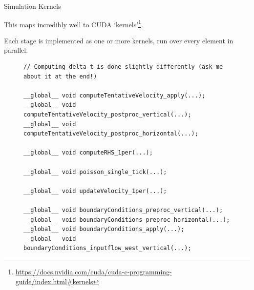 \begin{frame}[fragile]{Simulation Kernels}
        \begin{wideitemize}
            \item This maps incredibly well to CUDA `kernels'\footnote{\url{https://docs.nvidia.com/cuda/cuda-c-programming-guide/index.html\#kernels}}.
            \item Each stage is implemented as one or more kernels, run over every element in parallel.
        \end{wideitemize}
    \begin{figure}[b]
        \centering

        \begin{lstlisting}
// Computing delta-t is done slightly differently (ask me about it at the end!)
        
__global__ void computeTentativeVelocity_apply(...);
__global__ void computeTentativeVelocity_postproc_vertical(...);
__global__ void computeTentativeVelocity_postproc_horizontal(...);

__global__ void computeRHS_1per(...);

__global__ void poisson_single_tick(...);

__global__ void updateVelocity_1per(...);

__global__ void boundaryConditions_preproc_vertical(...);
__global__ void boundaryConditions_preproc_horizontal(...);
__global__ void boundaryConditions_apply(...);
__global__ void boundaryConditions_inputflow_west_vertical(...);\end{lstlisting}

    \end{figure}
\end{frame}

